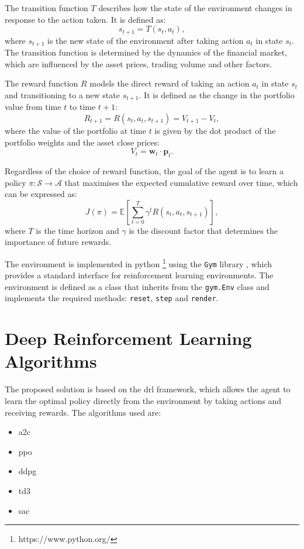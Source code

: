 The transition function $T$ describes how the state of the environment changes in response to the action taken. It is defined as:
\begin{equation}
    s_{t+1} = T(s_t, a_t),
\end{equation}
where $s_{t+1}$ is the new state of the environment after taking action $a_t$ in state $s_t$. The transition function is determined by the dynamics of the financial market, which are influenced by the asset prices, trading volume and other factors.

The reward function $R$ models the direct reward of taking an action $a_t$ in state $s_t$ and transitioning to a new state $s_{t+1}$. It is defined as the change in the portfolio value from time $t$ to time $t+1$:
\begin{equation}
    R_{t+1} = R(s_t, a_t, s_{t+1}) = V_{t+1} - V_t,
\end{equation}
where the value of the portfolio at time $t$ is given by the dot product of the portfolio weights and the asset close prices:
\begin{equation}
    V_t = \mathbf{w}_t \cdot \mathbf{p}_t.
\end{equation}

Regardless of the choice of reward function, the goal of the agent is to learn a policy $\pi: \mathcal{S} \to \mathcal{A}$ that maximises the expected cumulative reward over time, which can be expressed as:
\begin{equation}
    J(\pi) = \mathbb{E} \left[\sum_{t=0}^{T} \gamma^t R(s_t, a_t, s_{t+1}) \right],
\end{equation} 
where $T$ is the time horizon and $\gamma$ is the discount factor that determines the importance of future rewards. 

The environment is implemented in \Gls{python} \footnote{https://www.python.org/} using the \texttt{Gym} library \cite{Brockman2016}, which provides a standard interface for reinforcement learning environments. The environment is defined as a class that inherits from the \texttt{gym.Env} class and implements the required methods: \texttt{reset}, \texttt{step} and \texttt{render}.

\section{Deep Reinforcement Learning Algorithms} \label{sec:drl-algorithms}

The proposed solution is based on the \acrshort{drl} framework, which allows the agent to learn the optimal policy directly from the environment by taking actions and receiving rewards. The algorithms used are:
\begin{itemize}
    \item \acrfull{a2c}
    \item \acrfull{ppo}
    \item \acrfull{ddpg}
    \item \acrfull{td3}
    \item \acrfull{sac}
\end{itemize}

